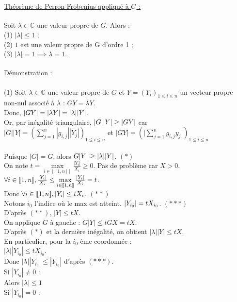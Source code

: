 \documentclass{article}
\begin{document}
\\\\\underline{Théorème de Perron-Frobenius appliqué à $G$ :}
\\\\Soit $\lambda \in \mathbb{C}$ une valeur propre de $G$. Alors :
\\(1) $|\lambda | \leq 1$ ;
\\(2) $1$ est une valeur propre de G d'ordre 1 ;
\\(3) $|\lambda |=1 \implies \lambda =1$.
\\\\\underline{Démonstration :}
\\\\(1) Soit $\lambda \in \mathbb{C}$ une valeur propre de $G$ et $Y=(Y_i)_{1\leq i\leq n}$ un vecteur propre non-nul associé à $\lambda$ : $GY=\lambda Y$.
\\Donc, $|GY|=|\lambda Y|=|\lambda|\space|Y|$.
\\Or, par inégalité triangulaire, $|G|\space|Y|\geq|GY|$ car $|G||Y|=\left(\sum\limits_{j=1}^n |g_{i,j}||Y_j|\right)_{1\leq i\leq n}$ et $|GY|=\left(\Bigg|\sum\limits_{j=1}^n g_{i,j}y_{j}\Bigg|\right)_{1\leq i\leq n}$
\\\\Puisque $|G|=G$, alors $G\space|Y|\geq|\lambda|\space|Y|$. $(*)$
\\On note $t=\max\limits_{i \in [\![1,n]\!]}\frac{|Y_i|}{X_i}\geq0$. Pas de problème car $X>0$.
\\$\forall\space i\in [\![1,n]\!], \frac{|Y_i|}{X_i}\leq\max\limits_{i\in[\![1,n]\!]}\frac{|Y_i|}{X_i}=t$.
\\Donc $\forall i \in [\![1,n]\!],|Y_i|\leq t\space X_i$. $(**)$
\\Notons $i_0$ l'indice où le max est atteint. $|Y_{i_0}|=t\space X_{i_0}$. $(***)$
\\D'après $(**)$, $|Y|\leq tX$.
\\On applique $G$ à gauche : $G|Y|\leq tGX=tX$.
\\D'après $(*)$ et la dernière inégalité, on obtient $|\lambda||Y|\leq tX$.
\\En particulier, pour la $i_0$-ème coordonnée :
\\$|\lambda||Y_{i_0}|\leq tX_{i_0}$.
\\Donc $|\lambda||Y_{i_0}|\leq|Y_{i_0}|$ d'après $(***)$.
\\Si $|Y_{i_0}|\neq 0$ :
\\Alors $|\lambda|\leq 1$
\\Si $|Y_{i_0}|=0$ :
\end{document}
